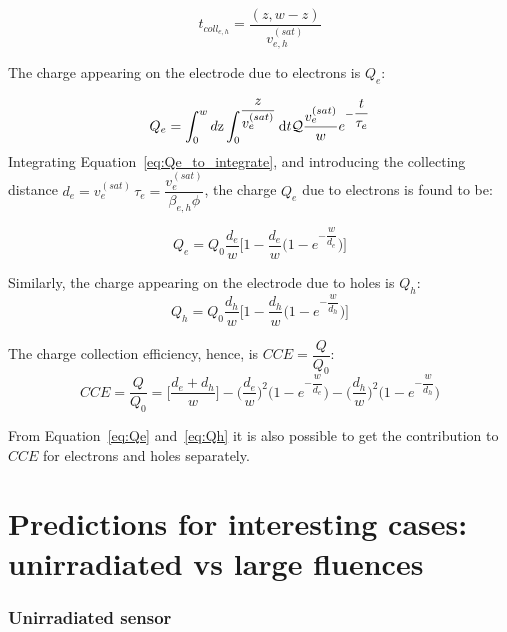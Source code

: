 \begin{equation}
t_{coll_{e,h}}=\dfrac{(z,w-z)}{v^{(sat)}_{e,h}}
\end{equation}

The charge appearing on the electrode due to electrons  is $Q_e$:

\begin{equation}
Q_e = \int_0^wd{\rm z}\int_0^{\dfrac{z}{v^{(sat)}_{e}}}{\rm d}t\mathcal{Q}\dfrac{v^{(sat)}_{e}}{w}e^{-\dfrac{t}{\tau_{e}}}
\label{eq:Qe_to_integrate}
\end{equation}
Integrating Equation~\ref{eq:Qe_to_integrate}, and introducing the collecting distance $d_e=v^{(sat)}_{e}\,\tau_{e}=\dfrac{v^{(sat)}_{e}}{\beta_{e,h}\phi}$, the charge  $Q_e$ due to electrons is found to be:

\begin{equation}
Q_e=Q_0\dfrac{d_e}{w}\Big[1-\dfrac{d_e}{w}\Big(1-e^{-\dfrac{w}{d_e}}\Big)\Big]
\label{eq:Qe}
\end{equation}

Similarly, the charge appearing on the electrode due to holes is $Q_h$:
\begin{equation}
Q_h=Q_0\dfrac{d_h}{w}\Big[1-\dfrac{d_h}{w}\Big(1-e^{-\dfrac{w}{d_h}}\Big)\Big]
\label{eq:Qh}
\end{equation}

The charge collection efficiency, hence, is  $CCE=\dfrac{Q}{Q_0}$:
\begin{equation}
CCE=\dfrac{Q}{Q_0}=\Big[\dfrac{d_e+d_h}{w}\Big]-\Big(\dfrac{d_e}{w}\Big)^2\Big(1-e^{-\dfrac{w}{d_e}}\Big)-\Big(\dfrac{d_h}{w}\Big)^2\Big(1-e^{-\dfrac{w}{d_h}}\Big)
\label{eq:CCE}
\end{equation}

From Equation~\ref{eq:Qe} and~\ref{eq:Qh} it is also possible to get the contribution to $CCE$ 
for electrons and holes separately. 

\section{Predictions for interesting cases: unirradiated vs large fluences}

\subsubsection{Unirradiated sensor}

